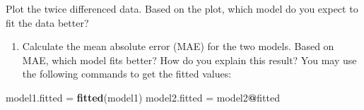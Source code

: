 \documentclass[
]{article}
\newenvironment{Shaded}{\begin{snugshade}}{\end{snugshade}}
\newcommand{\KeywordTok}[1]{\textcolor[rgb]{0.13,0.29,0.53}{\textbf{#1}}}
\newcommand{\NormalTok}[1]{#1}
\newcommand{\OperatorTok}[1]{\textcolor[rgb]{0.81,0.36,0.00}{\textbf{#1}}}
\newcommand{\StringTok}[1]{\textcolor[rgb]{0.31,0.60,0.02}{#1}}
\providecommand{\tightlist}{%
  \setlength{\itemsep}{0pt}\setlength{\parskip}{0pt}}
\begin{document}
Plot the twice differenced data. Based on the plot, which model do you
expect to fit the data better?

\begin{enumerate}
\def\labelenumi{(\alph{enumi})}
\setcounter{enumi}{1}
\tightlist
\item
  Calculate the mean absolute error (MAE) for the two models. Based on
  MAE, which model fits better? How do you explain this result? You may
  use the following commands to get the fitted values:
\end{enumerate}

\begin{Shaded}
\begin{Highlighting}[]
\NormalTok{model1.fitted =}\StringTok{ }\KeywordTok{fitted}\NormalTok{(model1)}
\NormalTok{model2.fitted =}\StringTok{ }\NormalTok{model2}\OperatorTok{@}\NormalTok{fitted}
\end{Highlighting}
\end{Shaded}
\end{document}
